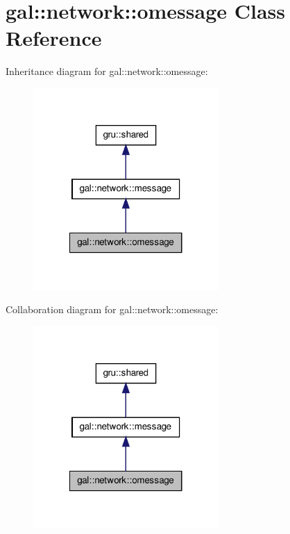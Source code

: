 \hypertarget{classgal_1_1network_1_1omessage}{\section{gal\-:\-:network\-:\-:omessage \-Class \-Reference}
\label{classgal_1_1network_1_1omessage}
}


\-Inheritance diagram for gal\-:\-:network\-:\-:omessage\-:\nopagebreak
\begin{figure}[H]
\begin{center}
\leavevmode
\includegraphics[width=200pt]{classgal_1_1network_1_1omessage__inherit__graph}
\end{center}
\end{figure}


\-Collaboration diagram for gal\-:\-:network\-:\-:omessage\-:\nopagebreak
\begin{figure}[H]
\begin{center}
\leavevmode
\includegraphics[width=200pt]{classgal_1_1network_1_1omessage__coll__graph}
\end{center}
\end{figure}
